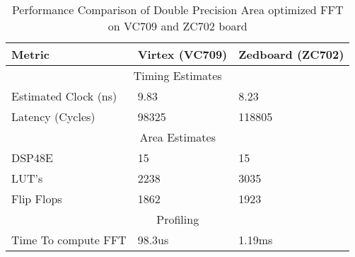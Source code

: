 \begin{table}[!h]
\centering
\begin{tabular}{||m{5.5cm}|m{4cm}|m{4cm}||}
\hline
Metric & Virtex (VC709) & Zedboard (ZC702)\\
\hline
\multicolumn{3}{||c||}{Timing Estimates}\\
\hline
Estimated Clock (ns) & 9.83 & 8.23\\
\hline
Latency (Cycles) &98325&118805\\
\hline
\multicolumn{3}{||c||}{Area Estimates}\\\cline{1-3}

DSP48E & 15 & 15\\
\hline
LUT's &2238 & 3035\\
\hline
Flip Flops  &1862 & 1923\\
\hline
\multicolumn{3}{||c||}{Profiling}\\
\hline
Time To compute FFT &98.3us& 1.19ms\\
\hline
\end{tabular}
\caption{Performance Comparison of Double Precision Area optimized FFT on VC709 and ZC702 board}
\label{Table 4.3}
\end{table}